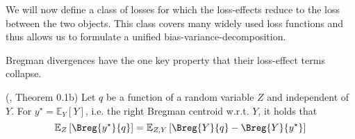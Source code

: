 \documentclass[../main.tex]{subfiles}
\begin{document}

We will now define a class of losses for which the loss-effects reduce to the loss between the two objects. This class covers many widely used loss functions and thus allows us to formulate a unified bias-variance-decomposition. 



Bregman divergences have the one key property that their loss-effect terms collapse. 

\begin{lemma} \label{thm:bregman-collapse-bias} (\cite{pfau_GeneralizedBiasVarianceDecomposition_}, Theorem 0.1b)
    Let $q$ be a function of a random variable $Z$ and independent of $Y$. For $y^\star = \mathbb{E}_{Y}\left[ Y \right]$, i.e. the right Bregman centroid w.r.t. $Y$, it holds that
$$
\mathbb{E}_{Z}\left[ \Breg{y^\star}{q} \right]  = \mathbb{E}_{Z,Y}\left[ \Breg{Y}{q} - \Breg{Y}{y^\star} \right] 
$$
\end{lemma}
\end{document}
